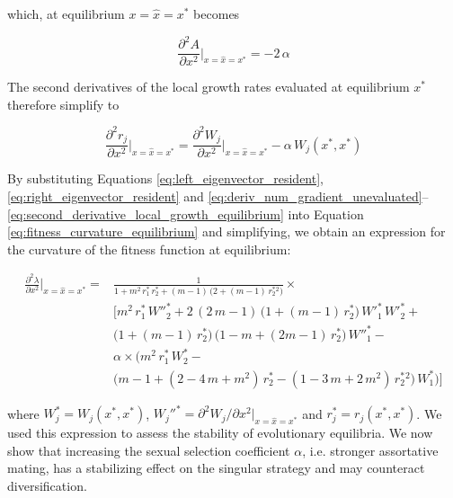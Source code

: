 which, at equilibrium $x=\hat{x}=x^*$ becomes

\begin{equation}
    \frac{\partial^2 A}{\partial x^2}\bigg|_{x=\hat{x}=x^*} = -2\,\alpha
\end{equation}

The second derivatives of the local growth rates evaluated at equilibrium $x^*$ therefore simplify to

\begin{equation}
    \frac{\partial^2 r_j}{\partial x^2}\bigg|_{x=\hat{x}=x^*}= \frac{\partial^2 W_j}{\partial x^2}\bigg|_{x=\hat{x}=x^*} - \alpha \, W_j(x^*,x^*)
    \label{eq:second_derivative_local_growth_equilibrium}
\end{equation}

By substituting Equations \ref{eq:left_eigenvector_resident}, \ref{eq:right_eigenvector_resident} and \ref{eq:deriv_num_gradient_unevaluated}--\ref{eq:second_derivative_local_growth_equilibrium} into Equation \ref{eq:fitness_curvature_equilibrium} and simplifying, we obtain an expression for the curvature of the fitness function at equilibrium:

\begin{equation}
    \begin{split}
        \frac{\partial^2 \lambda}{\partial x^2}\bigg|_{x=\hat x=x^*}=&\frac{1}{1 + m^2\,r^*_1\,r^*_2 + (m - 1)\,\big(2 + (m - 1)\,r^*_2^2\big)} \times \\
        &\Bigg[m^2\, r^*_ 1\, W''^*_2 + 2\, (2\, m - 1)\, \big(1 + (m - 1)\, r^*_ 2\big)\, W'^*_1 \, W'^*_2 +\\
        &\big(1 + (m - 1) \, r^*_ 2\big)\, \big(1 - m + (2 m - 1) \,r^*_ 2\big)\, W''^*_1 -\\
        &\alpha \times \Big(m^2\, r^*_ 1\, W^*_2 - \\
        & \big(m - 1 + (2 - 4\,m + m^2)\, r^*_ 2 - (1 - 3\,m + 2\,m^2)\,r^*_ 2^2\big)\,W^*_1 \Big)\Bigg]
    \end{split}
    \label{eq:fitness_curvature_equilibrium_expression}
\end{equation}

where $W_j^* = W_j(x^*, x^*)$, $W_j''^* = \partial^2 W_j / \partial x^2 |_{x=\hat{x}=x^*}$ and $r_j^* = r_j(x^*, x^*)$. We used this expression to assess the stability of evolutionary equilibria. We now show that increasing the sexual selection coefficient $\alpha$, i.e. stronger assortative mating, has a stabilizing effect on the singular strategy and may counteract diversification.


